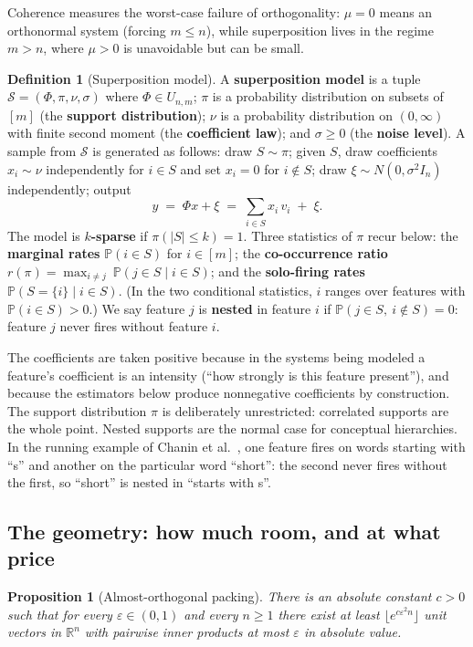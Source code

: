 \documentclass[11pt]{amsart}
\theoremstyle{plain}
\newtheorem{proposition}[theorem]{Proposition}
\theoremstyle{definition}
\newtheorem{definition}[theorem]{Definition}
\newcommand{\R}{\mathbb{R}}
\newcommand{\pr}{\mathbb{P}}
\begin{document}
Coherence measures the worst-case failure of orthogonality: $\mu=0$ means an orthonormal system (forcing $m\le n$), while superposition lives in the regime $m>n$, where $\mu>0$ is unavoidable but can be small.

\begin{definition}[Superposition model]\label{def:model}
A \textbf{superposition model} is a tuple $\mathcal{S}=(\Phi,\pi,\nu,\sigma)$ where $\Phi\in U_{n,m}$; $\pi$ is a probability distribution on subsets of $[m]$ (the \textbf{support distribution}); $\nu$ is a probability distribution on $(0,\infty)$ with finite second moment (the \textbf{coefficient law}); and $\sigma\ge 0$ (the \textbf{noise level}). A sample from $\mathcal{S}$ is generated as follows: draw $S\sim\pi$; given $S$, draw coefficients $x_i\sim\nu$ independently for $i\in S$ and set $x_i=0$ for $i\notin S$; draw $\xi\sim N(0,\sigma^2 I_n)$ independently; output
\[
  y \;=\; \Phi x + \xi \;=\; \sum_{i\in S} x_i\,v_i \;+\;\xi .
\]
The model is \textbf{$k$-sparse} if $\pi(\lvert S\rvert\le k)=1$. Three statistics of $\pi$ recur below: the \textbf{marginal rates} $\pr(i\in S)$ for $i\in[m]$; the \textbf{co-occurrence ratio}
$r(\pi)=\max_{i\neq j}\ \pr(j\in S \mid i\in S)$;
and the \textbf{solo-firing rates} $\pr(S=\{i\}\mid i\in S)$. (In the two conditional statistics, $i$ ranges over features with $\pr(i\in S)>0$.) We say feature $j$ is \textbf{nested} in feature $i$ if $\pr(j\in S,\ i\notin S)=0$: feature $j$ never fires without feature $i$.
\end{definition}

The coefficients are taken positive because in the systems being modeled a feature's coefficient is an intensity (``how strongly is this feature present''), and because the estimators below produce nonnegative coefficients by construction. The support distribution $\pi$ is deliberately unrestricted: correlated supports are the whole point. Nested supports are the normal case for conceptual hierarchies. In the running example of Chanin et al.~\cite{chanin2024}, one feature fires on words starting with ``s'' and another on the particular word ``short'': the second never fires without the first, so ``short'' is nested in ``starts with s''.

\subsection{The geometry: how much room, and at what price}

\begin{proposition}[Almost-orthogonal packing]\label{prop:packing}
There is an absolute constant $c>0$ such that for every $\varepsilon\in(0,1)$ and every $n\ge 1$ there exist at least $\lfloor e^{c\varepsilon^2 n}\rfloor$ unit vectors in $\R^n$ with pairwise inner products at most $\varepsilon$ in absolute value.
\end{proposition}
\end{document}
